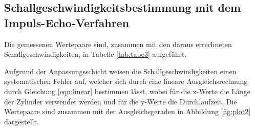 \subsection{Schallgeschwindigkeitsbestimmung mit dem Impuls-Echo-Verfahren}
Die gemessenen Wertepaare sind, zusammen mit den daraus errechneten
Schallgeschwindigkeiten, in Tabelle \ref{tab:tabe3} aufgeführt.

Aufgrund der Anpassungsschicht weisen die Schallgeschwindigkeiten einen systematischen
Fehler auf, %
%
welcher sich durch eine lineare Ausgleichsrechnung durch Gleichung \ref{eqn:linear}
bestimmen lässt, wobei für die x-Werte die Länge der Zylinder verwendet werden und
für die y-Werte die Durchlaufzeit. Die Wertepaare sind zusammen mit der
Ausgleichsgeraden in Abbildung \ref{fig:plot2} dargestellt.
